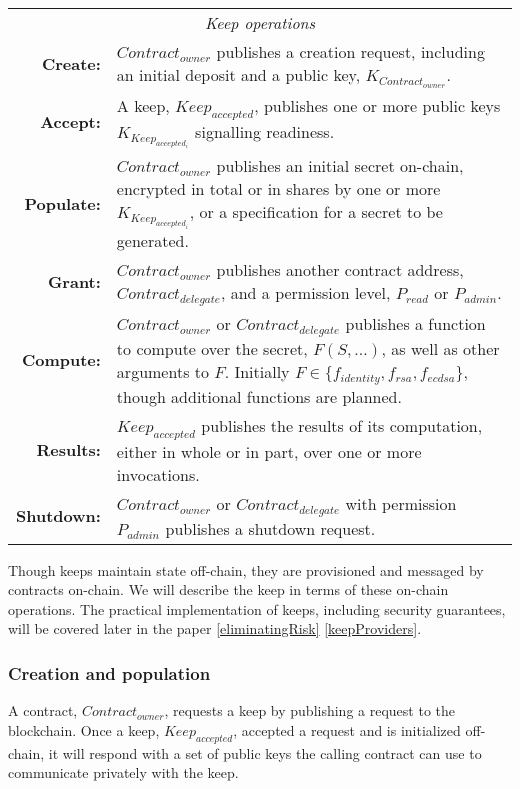 \documentclass[11pt]{article}
\begin{document}
\begin{table*}[t]
  \centering
  \begin{tabular}{|rp{10cm}|}
  \hline
  \multicolumn{2}{|c|}{\textit{Keep operations}} \\
  \textbf{Create:} & $Contract_{owner}$ publishes a creation request,
  including an initial deposit and a public key,
  $K_{Contract_{owner}}$.\\
  \textbf{Accept:} & A keep, $Keep_{accepted}$, publishes one or more
  public keys $K_{Keep_{accepted_i}}$ signalling readiness.\\
  \textbf{Populate:} & $Contract_{owner}$ publishes an initial
  secret on-chain, encrypted in total or in shares by one or more
  $K_{Keep_{accepted_i}}$, or a specification for a secret to be
  generated.\\
  \textbf{Grant:} & $Contract_{owner}$ publishes another contract
  address, $Contract_{delegate}$, and a permission level, $P_{read}$
  or $P_{admin}$.\\
  \textbf{Compute:} & $Contract_{owner}$ or $Contract_{delegate}$
  publishes a function to compute over the secret, $F(S,...)$, as well
  as other arguments to $F$. Initially $F {\in}
  \{f_{identity},f_{rsa},f_{ecdsa}\}$, though additional functions are
  planned.\\
  \textbf{Results:} & $Keep_{accepted}$ publishes the results
  of its computation, either in whole or in part, over one or more
  invocations.\\
  \textbf{Shutdown:} & $Contract_{owner}$ or $Contract_{delegate}$
  with permission $P_{admin}$ publishes a shutdown request.\\
  \hline
\end{tabular}
\end{table*}

Though keeps maintain state off-chain, they are provisioned and
messaged by contracts on-chain. We will describe the keep in terms of
these on-chain operations. The practical implementation of keeps,
including security guarantees, will be covered later in the paper
\ref{eliminatingRisk} \ref{keepProviders}.

\subsubsection{Creation and population}

A contract, $Contract_{owner}$, requests a keep by publishing a
request to the blockchain. Once a keep, $Keep_{accepted}$, accepted a
request and is initialized off-chain, it will respond with a set of
public keys the calling contract can use to communicate privately with
the keep.
\end{document}

